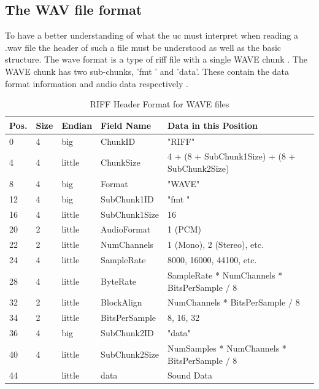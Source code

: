 \documentclass[12pt,a4paper]{report}
\begin{document}
\subsection{The WAV file format} \label{sec:waveformat}
To have a better understanding of what the \ac{uc} must interpret when reading a .wav file the header of such a file must be understood as well as the basic structure. The wave format is a type of \ac{riff} file with a single WAVE chunk \cite{wave}. The WAVE chunk has two sub-chunks, 'fmt ' and 'data'. These contain the data format information and audio data respectively \cite{wave}.
\begin{table}[h!]
	\centering
	\begin{tabular}{ | l | l | l | l | p{7.5cm} | }
		\hline 
		\textbf{Pos.} & \textbf{Size} & \textbf{Endian} & \textbf{Field Name} & \textbf{Data in this Position} \\ \hline
		0 & 4 & big & ChunkID & "RIFF" \\ \hline
		4 & 4 & little & ChunkSize & 4 + (8 + SubChunk1Size) + (8 + SubChunk2Size) \\ \hline
		8 & 4 & big & Format & "WAVE" \\ \hline
		12 & 4 & big & SubChunk1ID & "fmt " \\ \hline
		16 & 4 & little & SubChunk1Size & 16 \\ \hline
		20 & 2 & little & AudioFormat & 1 (PCM) \\ \hline
		22 & 2 & little & NumChannels & 1 (Mono), 2 (Stereo), etc. \\ \hline
		24 & 4 & little & SampleRate & 8000, 16000, 44100, etc. \\ \hline
		28 & 4 & little & ByteRate & SampleRate * NumChannels * BitsPerSample / 8 \\ \hline
		32 & 2 & little & BlockAlign & NumChannels * BitsPerSample / 8 \\ \hline
		34 & 2 & little & BitsPerSample & 8, 16, 32 \\ \hline
		36 & 4 & big & SubChunk2ID & "data" \\ \hline
		40 & 4 & little & SubChunk2Size & NumSamples * NumChannels * BitsPerSample / 8 \\ \hline
		44 &  & little & data & Sound Data \\ \hline
	\end{tabular}
	\caption{RIFF Header Format for WAVE files \cite{wave}}
	\label{tab:riffheader}
\end{table}\\
\end{document}
